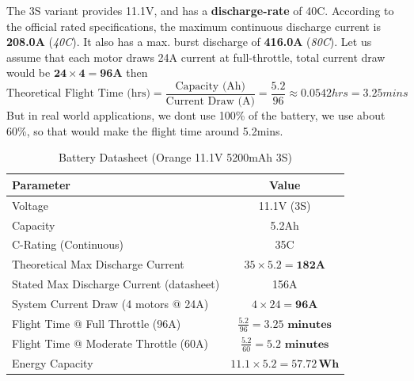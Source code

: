 \documentclass[12pt]{report}
\begin{document}
      The 3S variant provides 11.1V, and has a \textbf{discharge-rate} of 40C. According to the official rated specifications, the maximum continuous discharge current is \textbf{208.0A} (\textit{40C}). It also has a max. burst discharge of \textbf{416.0A} (\textit{80C}). Let us assume that each motor draws 24A current at full-throttle, total current draw would be $ \boldsymbol{24 \times 4 = 96A} $ then \vspace{0.5cm} \[ \text{Theoretical Flight Time (hrs)} = \frac{\text{Capacity (Ah)}}{\text{Current Draw (A)}} = \frac{5.2}{96} \approx 0.0542 hrs = 3.25 mins \] But in real world applications, we dont use 100\% of the battery, we use about 60\%, so that would make the flight time around 5.2mins. 
      \begin{table}[h!]
      \centering
      \caption{Battery Datasheet (Orange 11.1V 5200mAh 3S)}
        \begin{tabular}{|l|c|}
          \hline
          \textbf{Parameter} & \textbf{Value} \\
          \hline
          Voltage & 11.1V (3S) \\
          \hline
          Capacity & 5.2Ah \\
          \hline
          C-Rating (Continuous) & 35C \\
          \hline
          Theoretical Max Discharge Current & $35 \times 5.2 = \mathbf{182A}$ \\
          \hline
          Stated Max Discharge Current (datasheet) & 156A \\
          \hline
          System Current Draw (4 motors @ 24A) & $4 \times 24 = \mathbf{96A}$ \\
          \hline
              Flight Time @ Full Throttle (96A) & $\frac{5.2}{96} = \mathbf{3.25 \text{ minutes}}$ \\
          \hline
          Flight Time @ Moderate Throttle (60A) & $\frac{5.2}{60} = \mathbf{5.2 \text{ minutes}}$ \\
          \hline
          Energy Capacity & $11.1 \times 5.2 = \mathbf{57.72\,Wh}$ \\
          \hline
        \end{tabular}
      \end{table}
    
\end{document}
